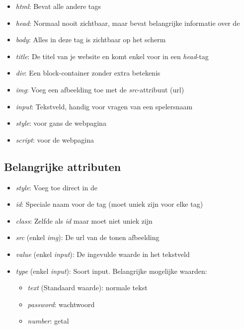\begin{itemize}
    \item \emph{html}: Bevat alle andere \HTML tags
    \item \emph{head}: Normaal nooit zichtbaar, maar bevat belangrijke informatie over de \HTML
    \item \emph{body}: Alles in deze tag is zichtbaar op het scherm
    \item \emph{title}: De titel van je website en komt enkel voor in een \emph{head}-tag
    \item \emph{div}: Een block-container zonder extra betekenis
    \item \emph{img}: Voeg een afbeelding toe met de \emph{src}-attribuut (url)
    \item \emph{input}: Tekstveld, handig voor vragen van een spelersnaam
    \item \emph{style}: \CSS voor gans de webpagina
    \item \emph{script}: \JS voor de webpagina
\end{itemize}

\subsection{Belangrijke attributen}%
\label{sub:belangrijke_attributen}

\begin{itemize}
    \item \emph{style}: Voeg \CSS toe direct in de \HTML
    \item \emph{id}: Speciale naam voor de tag (moet uniek zijn voor elke tag)
    \item \emph{class}: Zelfde als \emph{id} maar moet niet uniek zijn
    \item \emph{src} (enkel \emph{img}): De url van de tonen afbeelding
    \item \emph{value} (enkel \emph{input}): De ingevulde waarde in het tekstveld
    \item \emph{type} (enkel \emph{input}): Soort input. Belangrijke mogelijke waarden:
        \begin{itemize}
            \item \emph{text} (Standaard waarde): normale tekst
            \item \emph{password}: wachtwoord
            \item \emph{number}: getal
        \end{itemize}
\end{itemize}

